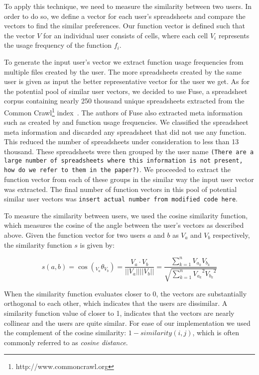 \documentclass[conference]{IEEEtran}
\begin{document}
To apply this technique, we need to measure the similarity between two users. In order to do so, we define a vector for each user's spreadsheets and compare the vectors to find the similar preferences. Our function vector is defined such that the vector $V$ for an individual user consists of cells, where each cell $V_i$ represents the usage frequency of the function $f_i$.

To generate the input user's vector we extract function usage frequencies from multiple files created by the user. The more spreadsheets created by the same user is given as input the better representative vector for the user we get. As for the potential pool of similar user vectors, we decided to use Fuse, a spreadsheet corpus containing nearly 250 thousand unique spreadsheets extracted from the Common Crawl\footnote{http://www.commoncrawl.org} index~\cite{barik2015fuse}. The authors of Fuse also extracted meta information such as created by and function usage frequencies. We classified the spreadsheet meta information and discarded any spreadsheet that did not use any function. This reduced the number of spreadsheets under consideration to less than 13 thousand. These spreadsheets were then grouped by the user name \texttt{(There are a large number of spreadsheets where this information is not present, how do we refer to them in the paper?)}. We proceeded to extract the function vector from each of these groups in the similar way the input user vector was extracted. The final number of function vectors in this pool of potential similar user vectors was \texttt{insert actual number from modified code here}.

To measure the similarity between users, we used the cosine similarity function, which measures the cosine of the angle between the user's vectors as described above. Given the function vector for two users $a$ and $b$ as $V_a$ and $V_b$ respectively, the similarity function $s$ is given by:

\begin{center}
	\[
	s(a, b) = \cos({}_{V_a}\theta_{V_b}) = \frac{V_a \cdot V_b}{||V_a|| ||V_b||} = \frac{\sum\limits_{k=1}^{n} V_{a_k}V_{b_k}}{\sqrt{\sum\limits_{k=1}^{n} {V_{a_k}}^2  {V_{b_k}}^2}}
	\]
\end{center}

When the similarity function evaluates closer to 0, the vectors are substantially orthogonal to each other, which indicates that the users are dissimilar. A similarity function value of closer to 1, indicates that the vectors are nearly collinear and the users are quite similar. For ease of our implementation we used the complement of the cosine similarity: $1 - similarity(i,j)$, which is often commonly referred to as \textit{cosine distance}.
\end{document}
